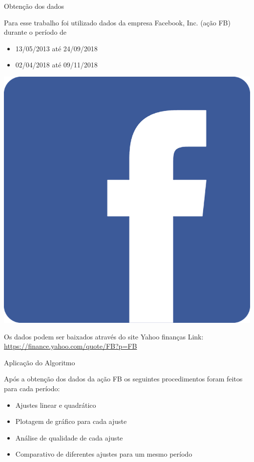 \documentclass[10pt]{beamer}
\begin{document}
\begin{frame}{Obtenção dos dados}

  Para esse trabalho foi utilizado dados da empresa Facebook, Inc. (ação FB) durante o período de 
  \begin{itemize}
    \item 13/05/2013 até 24/09/2018
    \item 02/04/2018 até 09/11/2018
  \end{itemize}
  
  \begin{center}
    \includegraphics[scale=0.10]{images/facebook.png}
  \end{center}
  Os dados podem ser baixados através do site Yahoo finanças \newline
  Link: \url{https://finance.yahoo.com/quote/FB?p=FB}
\end{frame}

\begin{frame}{Aplicação do Algoritmo}

  Após a obtenção dos dados da ação FB os seguintes procedimentos foram feitos para cada período:
  \begin{itemize}
      \item Ajustes linear e quadrático 
      \item Plotagem de gráfico para cada ajuste 
      \item Análise de qualidade de cada ajuste 
      \item Comparativo de diferentes ajustes para um mesmo período 
  \end{itemize}
\end{frame}
\end{document}
